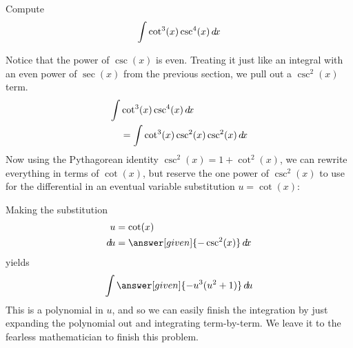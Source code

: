 \documentclass{ximera}
\begin{document}
\begin{example}
  Compute
  \[
  \int \cot^3(x) \csc^4(x) \mathop{}\!d\! x
  \]
  \begin{explanation}
    Notice that the power of $\csc(x)$ is even. Treating it just like an integral with an even power of $\sec(x)$ from 
    the previous section, we pull out a $\csc^{2}(x)$ term. 
    \begin{align*}
      \int &\cot^3(x) \csc^4(x) \mathop{}\!d\! x \\
    &= \int\cot^3(x) \csc^2(x) \csc^2(x) \mathop{}\!d\! x
    \end{align*}
    Now using the Pythagorean identity $\csc^{2}(x)=1+\cot^{2}(x)$, we can rewrite everything in
    terms of $\cot(x)$, but reserve the one power of $\csc^2(x)$ to use for the differential in an eventual variable substitution $u=\cot(x)$:
    \begin{center}%
    \end{center}
    Making the substitution
    \begin{align*}
      u &= \cot(x)\\
      \d u &=\answer[given]{-\csc^2(x)} \d x
    \end{align*}
    yields
    \[
    \int \answer[given]{-u^3(u^2+1)} \d u
    \]
    This is a polynomial in $u$, and so we can easily finish the
    integration by just expanding the polynomial out and integrating
    term-by-term. We leave it to the fearless mathematician to
    finish this problem.
  \end{explanation}
\end{example}
\end{document}
